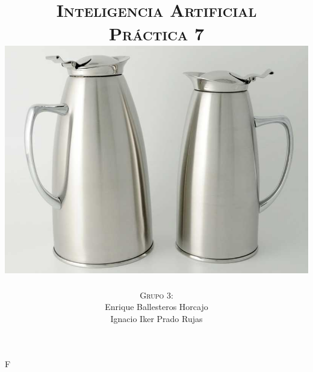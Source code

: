 F\documentclass[11pt, a4paper, spanish, openright, twoside]{book}
\begin{document}
 
\title{\Huge{\textsc{Inteligencia Artificial}} \\
	\vspace{0.7cm}
	 \textsc{\Large{Práctica 7}} \\
	\vspace{1.5cm}
	\includegraphics[scale=0.45]{jarras}}
\author{\textsc{Grupo 3:}\\
	Enrique Ballesteros Horcajo\\
	Ignacio Iker Prado Rujas}
\date{\Today}
\maketitle

\newpage
\mbox{}
\thispagestyle{empty}						%
\newpage


\tableofcontents 							%

\newpage
\mbox{}
\thispagestyle{empty}						%
\newpage


\vspace{3cm}


\newpage
\end{document}
